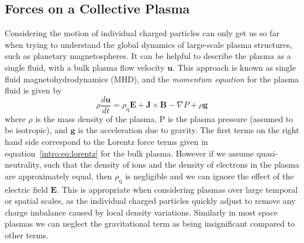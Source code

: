 \subsection{Forces on a Collective Plasma}
Considering the motion of individual charged particles can only get us so far when trying to understand the global dynamics of large-scale plasma structures, such as planetary magnetospheres. It can be helpful to describe the plasma as a single fluid, with a bulk plasma flow velocity $\boldsymbol{u}$. This approach is known as single fluid magnetohydrodynamics (MHD), and the \textit{momentum equation} for the plasma fluid is given by
\begin{equation}\label{intro:eq:momentum}
\rho\frac{d\boldsymbol{u}}{dt} = \rho_\mathrm{q}\boldsymbol{E} + \boldsymbol{J}\times\boldsymbol{B} - \nabla P + \rho \boldsymbol{g}
\end{equation}
where $\rho$ is the mass density of the plasma, P is the plasma pressure (assumed to be isotropic), and $\boldsymbol{g}$ is the acceleration due to gravity. The first terms on the right hand side correspond to the Lorentz force terms given in equation~\ref{intro:eq:lorentz} for the bulk plasma. However if we assume quasi-neutrality, such that the density of ions and the density of electrons in the plasma are approximately equal, then $\rho_\mathrm{q}$ is negligible and we can ignore the effect of the electric field $\boldsymbol{E}$. This is appropriate when considering plasmas over large temporal or spatial scales, as the individual charged particles quickly adjust to remove any charge imbalance caused by local density variations. Similarly in most space plasmas we can neglect the gravitational term as being insignificant compared to other terms.


